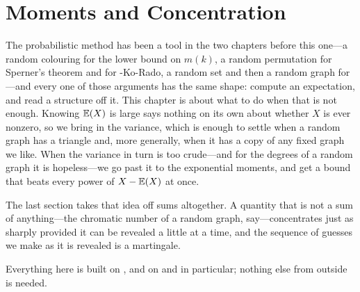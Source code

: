 \chapter{Moments and Concentration} \label{Ch4:CH}
\thispagestyle{empty}

The probabilistic method has been a tool in the two chapters before this one---a random colouring for the lower bound on $m(k)$, a random permutation for Sperner's theorem and for \Erdos-Ko-Rado, a random set and then a random graph for ---and every one of those arguments has the same shape: compute an expectation, and read a structure off it. This chapter is about what to do when that is not enough. Knowing $\mathbb{E}(X)$ is large says nothing on its own about whether $X$ is ever nonzero, so we bring in the variance, which is enough to settle when a random graph has a triangle and, more generally, when it has a copy of any fixed graph we like. When the variance in turn is too crude---and for the degrees of a random graph it is hopeless---we go past it to the exponential moments, and get a bound that beats every power of $X - \mathbb{E}(X)$ at once.

The last section takes that idea off sums altogether. A quantity that is not a sum of anything---the chromatic number of a random graph, say---concentrates just as sharply provided it can be revealed a little at a time, and the sequence of guesses we make as it is revealed is a martingale.

Everything here is built on , and on  and  in particular; nothing else from outside is needed.




